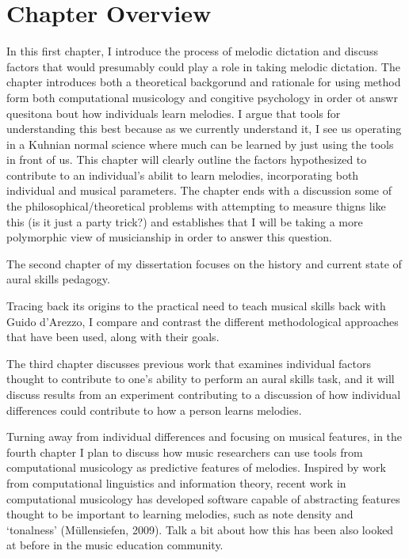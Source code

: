 \documentclass[]{book}
\theoremstyle{definition}
\theoremstyle{definition}
\theoremstyle{definition}
\theoremstyle{remark}
\begin{document}
\hypertarget{chapter-overview}{%
\section{Chapter Overview}\label{chapter-overview}}

In this first chapter, I introduce the process of melodic dictation and
discuss factors that would presumably could play a role in taking
melodic dictation. The chapter introduces both a theoretical backgorund
and rationale for using method form both computational musicology and
congitive psychology in order ot answr quesitona bout how individuals
learn melodies. I argue that tools for understanding this best because
as we currently understand it, I see us operating in a Kuhnian normal
science where much can be learned by just using the tools in front of
us. This chapter will clearly outline the factors hypothesized to
contribute to an individual's abilit to learn melodies, incorporating
both individual and musical parameters. The chapter ends with a
discussion some of the philosophical/theoretical problems with
attempting to measure thigns like this (is it just a party trick?) and
establishes that I will be taking a more polymorphic view of
musicianship in order to answer this question.

The second chapter of my dissertation focuses on the history and current
state of aural skills pedagogy.

Tracing back its origins to the practical need to teach musical skills
back with Guido d'Arezzo, I compare and contrast the different
methodological approaches that have been used, along with their goals.

The third chapter discusses previous work that examines individual
factors thought to contribute to one's ability to perform an aural
skills task, and it will discuss results from an experiment contributing
to a discussion of how individual differences could contribute to how a
person learns melodies.

Turning away from individual differences and focusing on musical
features, in the fourth chapter I plan to discuss how music researchers
can use tools from computational musicology as predictive features of
melodies. Inspired by work from computational linguistics and
information theory, recent work in computational musicology has
developed software capable of abstracting features thought to be
important to learning melodies, such as note density and `tonalness'
(Müllensiefen, 2009). Talk a bit about how this has been also looked at
before in the music education community.
\end{document}
